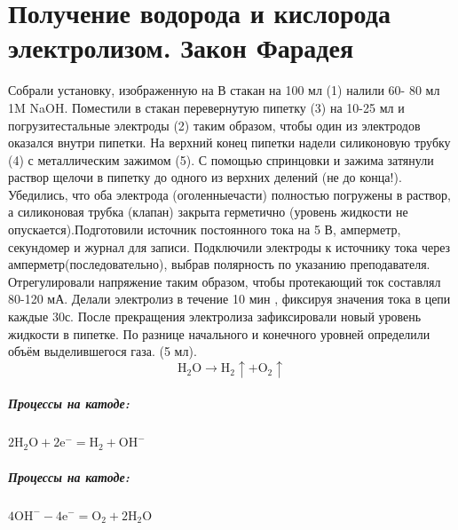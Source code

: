 \documentclass[a4paper,12pt]{article}
\begin{document}
\section{Получение водорода и кислорода электролизом. Закон Фарадея}
Собрали установку, изображенную на  В стакан на 100 мл (1) налили 60-
80 мл 1M NaOH. Поместили в стакан перевернутую пипетку (3) на 10-25 мл и погрузитестальные электроды (2) таким образом, чтобы один из электродов оказался внутри
пипетки. На верхний конец пипетки надели силиконовую трубку (4) с металлическим зажимом (5). С помощью спринцовки и зажима затянули раствор щелочи в пипетку до
одного из верхних делений (не до конца!). Убедились, что оба электрода (оголенныечасти) полностью погружены в раствор, а силиконовая трубка (клапан) закрыта
герметично (уровень жидкости не опускается).Подготовили источник постоянного тока на 5 В, амперметр, секундомер и
журнал для записи. Подключили электроды к источнику тока через амперметр(последовательно), выбрав полярность по указанию преподавателя. Отрегулировали
напряжение таким образом, чтобы протекающий ток составлял 80-120 мА. 
Делали электролиз в течение 10 мин , фиксируя значения тока в цепи каждые 30с.
После прекращения электролиза зафиксировали новый уровень жидкости
в пипетке. По разнице начального и конечного уровней определили объём выделившегося газа. (5 мл).
\begin{equation}
    \mathrm{H_2O \longrightarrow H_2\uparrow + O_2\uparrow}
\end{equation}
\subparagraph{Процессы на катоде:} $\mathrm{2H_2O+2e^-=H_2+OH^-}$
\subparagraph{Процессы на катоде:} $\mathrm{4OH^--4e^-=O_2+2H_2O}$
\end{document}
